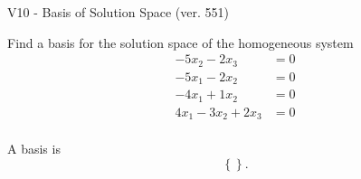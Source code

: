 \begin{exercise}
  \begin{exerciseTitle}V10 - Basis of Solution Space (ver. 551)\end{exerciseTitle}
  \begin{exerciseStatement}
    Find a basis for the solution space of the homogeneous system 
\begin{align*}
 -5 x_ 2 -2 x_ 3 &= 0  \\ 
  -5 x_ 1 -2 x_ 2 &= 0  \\ 
  -4 x_ 1 + 1 x_ 2 &= 0  \\ 
  4 x_ 1 -3 x_ 2 + 2 x_ 3 &= 0  \\ 
 \end{align*}


 
  \end{exerciseStatement}

  \begin{exerciseAnswer}
   A basis is   
\[\left\{\right\}.\]

  


  \end{exerciseAnswer}
\end{exercise}